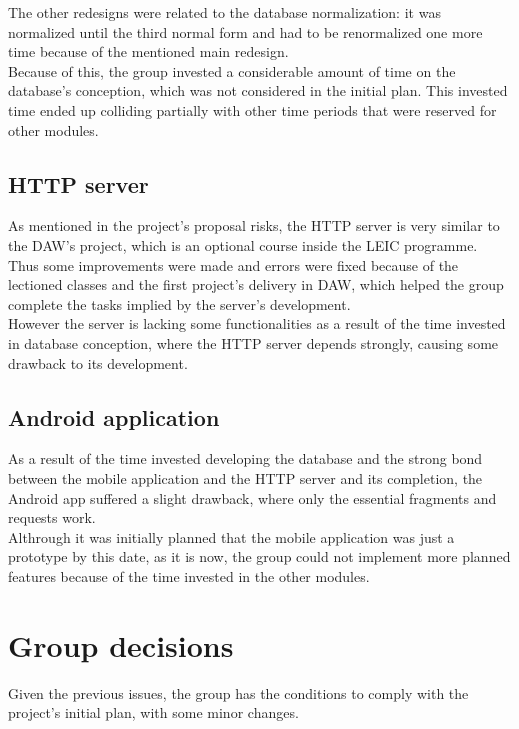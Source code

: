     The other redesigns were related to the database normalization: it was normalized until the third normal form 
    and had to be renormalized one more time because of the mentioned main redesign.\\ 

    Because of this, the group invested a considerable amount of time on the database's conception, which was not considered
    in the initial plan. This invested time ended up colliding partially with other time periods that were
    reserved for other modules.

    \subsection{HTTP server}

    As mentioned in the project's proposal risks, the HTTP server is very similar to the DAW's project, which is an optional
    course inside the LEIC programme. Thus some improvements were made and errors were fixed because of the lectioned classes 
    and the first project's delivery in DAW, which helped the group complete the tasks implied by the server's development.\\

    However the server is lacking some functionalities as a result of the time invested in database conception,
    where the HTTP server depends strongly, causing some drawback to its development.

    \subsection{Android application}

    As a result of the time invested developing the database and the strong bond between the mobile application and the HTTP server 
    and its completion, the Android app suffered a slight drawback, where only the essential fragments and requests work.\\

    Althrough it was initially planned that the mobile application was just a prototype by this date, as it is now, the group
    could not implement more planned features because of the time invested in the other modules.

    \section{Group decisions}

    Given the previous issues, the group has the conditions to comply with the project's initial plan, with some minor changes.\\
    
